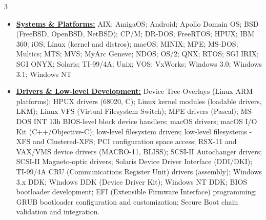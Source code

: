 \documentclass[letterpaper,11pt]{article}
\begin{document}
\begin{multicols}{3}
{\begin{itemize}[leftmargin=0.1in, label={}, itemsep=0pt, parsep=0pt, topsep=0pt, partopsep=0pt]
                \item
                \textbf{\uline{Systems \& Platforms:}} \hspace{0pt}
                AIX;
                AmigaOS;
                Android;
                Apollo Domain OS;
                BSD (FreeBSD, OpenBSD, NetBSD);
                CP/M;
                DR-DOS;
                FreeRTOS;
                HPUX;
                IBM 360;
                iOS;
                Linux (kernel and distros);
                macOS;
                MINIX;
                MPE;
                MS-DOS;
                Multics;
                MTS;
                MVS;
                MyArc Geneve;
                NDOS;
                OS/2;
                QNX;
                RTOS;
                SGI IRIX;
                SGI ONYX;
                Solaris;
                TI-99/4A;
                Unix;
                VOS;
                VxWorks;
                Windows 3.0;
                Windows 3.1;
                Windows NT

                \item
                \textbf{\uline{Drivers \& Low-level Development:}} \hspace{0pt}
                Device Tree Overlays (Linux ARM platforms);
                HPUX drivers (68020, C);
                Linux kernel modules (loadable drivers, LKM);
                Linux VFS (Virtual Filesystem Switch);
                MPE drivers (Pascal);
                MS-DOS INT 13h BIOS-level block device handlers;
                macOS drivers;
                macOS I/O Kit (C++/Objective-C);
                low-level filesystem drivers;
                low-level filesystems - XFS and Clustered-XFS;
                PCI configuration space access;
                RSX-11 and VAX/VMS device drivers (MACRO-11, BLISS);
                SCSI-II Autochanger drivers;
                SCSI-II Magneto-optic drivers;
                Solaris Device Driver Interface (DDI/DKI);
                TI-99/4A CRU (Communications Register Unit) drivers (assembly);
                Windows 3.x DDK;
                Windows DDK (Device Driver Kit);
                Windows NT DDK;
                BIOS bootloader development;
                EFI (Extensible Firmware Interface) programming;
                GRUB bootloader configuration and customization;
                Secure Boot chain validation and integration.


\end{itemize}}
\end{multicols}
\end{document}
